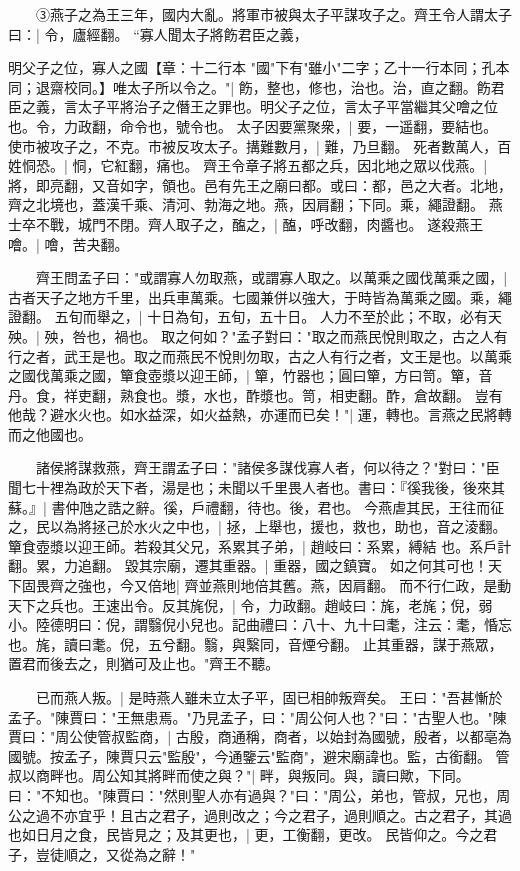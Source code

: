 　　③燕子之為王三年，國内大亂。將軍市被與太子平謀攻子之。齊王令人謂太子曰：|{
	令，廬經翻。
	}
“寡人聞太子將飭君臣之義，

明父子之位，寡人之國【章：十二行本 "國"下有"雖小"二字；乙十一行本同；孔本同；退齋校同。】唯太子所以令之。"|{
	飭，整也，修也，治也。治，直之翻。飭君臣之義，言太子平將治子之僭王之罪也。明父子之位，言太子平當繼其父噲之位也。令，力政翻，命令也，號令也。
	}
太子因要黨聚衆，|{
	要，一遥翻，要結也。
	}
使市被攻子之，不克。市被反攻太子。搆難數月，|{
	難，乃旦翻。
	}
死者數萬人，百姓恫恐。|{
	恫，它紅翻，痛也。
	}
齊王令章子將五都之兵，因北地之眾以伐燕。|{
	將，即亮翻，又音如字，領也。邑有先王之廟曰都。或曰：都，邑之大者。北地，齊之北境也，蓋漢千乘、清河、勃海之地。燕，因肩翻；下同。乘，繩證翻。
	}
燕士卒不戰，城門不閉。齊人取子之，醢之，|{
	醢，呼改翻，肉醬也。
	}
遂殺燕王噲。|{
	噲，苦夬翻。
	}

　　齊王問孟子曰："或謂寡人勿取燕，或謂寡人取之。以萬乘之國伐萬乘之國，|{
	古者天子之地方千里，出兵車萬乘。七國兼併以強大，于時皆為萬乘之國。乘，繩證翻。
	}
五旬而舉之，|{
	十日為旬，五旬，五十日。
	}
人力不至於此；不取，必有天殃。|{
	殃，咎也，禍也。
	}
取之何如？"孟子對曰："取之而燕民悅則取之，古之人有行之者，武王是也。取之而燕民不悅則勿取，古之人有行之者，文王是也。以萬乘之國伐萬乘之國，簞食壺漿以迎王師，|{
	簞，竹器也；圓曰簞，方曰笥。簞，音丹。食，祥吏翻，熟食也。漿，水也，酢漿也。笥，相吏翻。酢，倉故翻。
	}
豈有他哉？避水火也。如水益深，如火益熱，亦運而已矣！"|{
	運，轉也。言燕之民將轉而之他國也。
	}

　　諸侯將謀救燕，齊王謂孟子曰："諸侯多謀伐寡人者，何以待之？"對曰："臣聞七十裡為政於天下者，湯是也；未聞以千里畏人者也。書曰：『徯我後，後來其蘇。』|{
	書仲虺之誥之辭。徯，戶禮翻，待也。後，君也。
	}
今燕虐其民，王往而征之，民以為將拯己於水火之中也，|{
	拯，上舉也，援也，救也，助也，音之淩翻。
	}
簞食壺漿以迎王師。若殺其父兄，系累其子弟，|{
	趙岐曰：系累，縛結 也。系戶計翻。累，力追翻。
	}
毀其宗廟，遷其重器。|{
	重器，國之鎮寶。
	}
如之何其可也！天下固畏齊之強也，今又倍地|{
	齊並燕則地倍其舊。燕，因肩翻。
	}
而不行仁政，是動天下之兵也。王速出令。反其旄倪，|{
	令，力政翻。趙岐曰：旄，老旄；倪，弱小。陸德明曰：倪，謂翳倪小兒也。記曲禮曰：八十、九十曰耄，注云：耄，惛忘也。旄，讀曰耄。倪，五兮翻。翳，與繄同，音煙兮翻。
	}
止其重器，謀于燕眾，置君而後去之，則猶可及止也。"齊王不聽。

　　已而燕人叛。|{
	是時燕人雖未立太子平，固已相帥叛齊矣。
	}
王曰："吾甚慚於孟子。"陳賈曰："王無患焉。"乃見孟子，曰："周公何人也？"曰："古聖人也。"陳賈曰："周公使管叔監商，|{
	古殷，商通稱，商者，以始封為國號，殷者，以都亳為國號。按孟子，陳賈只云"監殷"，今通鑒云"監商"，避宋廟諱也。監，古銜翻。
	}
管叔以商畔也。周公知其將畔而使之與？"|{
	畔，與叛同。與，讀曰歟，下同。
	}
曰："不知也。"陳賈曰："然則聖人亦有過與？"曰："周公，弟也，管叔，兄也，周公之過不亦宜乎！且古之君子，過則改之；今之君子，過則順之。古之君子，其過也如日月之食，民皆見之；及其更也，|{
	更，工衡翻，更改。
	}
民皆仰之。今之君子，豈徒順之，又從為之辭！"


